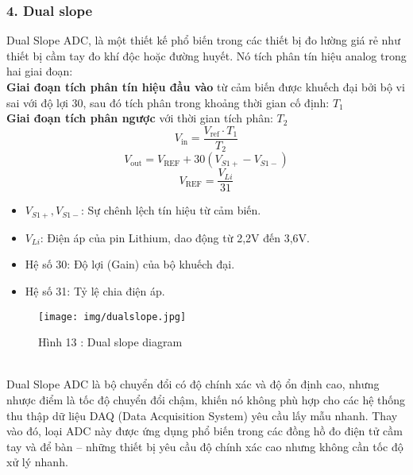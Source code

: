 \documentclass[a4paper,13pt]{article}
\begin{document}
\clearpage
\subsubsection*{4. Dual slope}
Dual Slope ADC, là một thiết kế phổ biến trong các thiết bị đo lường giá rẻ như thiết bị cầm tay đo khí độc hoặc đường huyết. Nó tích phân tín hiệu analog trong hai giai đoạn:\\
\textbf{Giai đoạn tích phân tín hiệu đầu vào} từ cảm biến được khuếch đại bởi bộ vi sai với độ lợi 30, sau đó tích phân trong khoảng thời gian cố định: \( T_1  \)\\
\textbf{Giai đoạn tích phân ngược} với thời gian tích phân: \(T_2\) 
\begin{equation}
V_{\text{in}} = \frac{V_{\text{ref}} \cdot T_1}{T_2} \tag{10}
\end{equation}
\begin{equation}
V_{\text{out}} = V_{\text{REF}} + 30(V_{S1+} - V_{S1-}) \tag {11}
\end{equation}
\begin{equation}
V_{\text{REF}} = \frac{V_{Li}}{31}  \tag{12}
\end{equation}
\begin{itemize}
    \item \(V_{S1+}, V_{S1-}\): Sự chênh lệch tín hiệu từ cảm biến.
    \item \(V_{Li}\): Điện áp của pin Lithium, dao động từ 2,2V đến 3,6V.
    \item Hệ số 30: Độ lợi (Gain) của bộ khuếch đại.
    \item Hệ số 31: Tỷ lệ chia điện áp.
\end{itemize}

\begin{figure}[htbp]
    \centering
    \texttt{[image: img/dualslope.jpg]}
    \caption*{Hình 13 : Dual slope diagram \cite{key5} }
    \label{fig:model}
\end{figure}\\
Dual Slope ADC là bộ chuyển đổi có độ chính xác và độ ổn định cao, nhưng nhược điểm là tốc độ chuyển đổi chậm, khiến nó không phù hợp cho các hệ thống thu thập dữ liệu DAQ (Data Acquisition System) yêu cầu lấy mẫu nhanh. Thay vào đó, loại ADC này được ứng dụng phổ biến trong các đồng hồ đo điện tử cầm tay và để bàn – những thiết bị yêu cầu độ chính xác cao nhưng không cần tốc độ xử lý nhanh.
\clearpage
\end{document}

